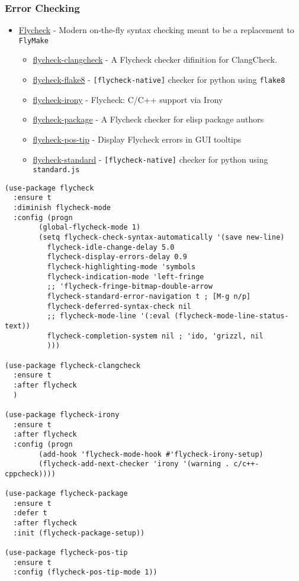 \documentclass[11pt]{article}
\begin{document}
\subsubsection{Error Checking}
\label{sec-1-6-3}
\begin{itemize}
\item \href{https://github.com/flycheck/flycheck}{Flycheck} - Modern on-the-fly syntax checking meant to be a replacement to \texttt{FlyMake}
\begin{itemize}
\item \href{https://github.com/kumar8600/flycheck-clangcheck}{flycheck-clangcheck} - A Flycheck checker difinition for ClangCheck.
\item \href{https://github.com/flycheck/flycheck}{flycheck-flake8} - \texttt{[flycheck-native]} checker for python using \texttt{flake8}
\item \href{https://github.com/Sarcasm/flycheck-irony}{flycheck-irony} - Flycheck: C/C++ support via Irony
\item \href{https://github.com/purcell/flycheck-package}{flycheck-package} - A Flycheck checker for elisp package authors
\item \href{https://github.com/flycheck/flycheck-pos-tip}{flycheck-pos-tip} - Display Flycheck errors in GUI tooltips
\item \href{https://github.com/flycheck/flycheck}{flycheck-standard} - \texttt{[flycheck-native]} checker for python using \texttt{standard.js}
\end{itemize}
\end{itemize}

\begin{verbatim}
(use-package flycheck
  :ensure t
  :diminish flycheck-mode
  :config (progn
	    (global-flycheck-mode 1)
	    (setq flycheck-check-syntax-automatically '(save new-line)
		  flycheck-idle-change-delay 5.0
		  flycheck-display-errors-delay 0.9
		  flycheck-highlighting-mode 'symbols
		  flycheck-indication-mode 'left-fringe
		  ;; 'flycheck-fringe-bitmap-double-arrow
		  flycheck-standard-error-navigation t ; [M-g n/p]
		  flycheck-deferred-syntax-check nil
		  ;; flycheck-mode-line '(:eval (flycheck-mode-line-status-text))
		  flycheck-completion-system nil ; 'ido, 'grizzl, nil
		  )))

(use-package flycheck-clangcheck
  :ensure t
  :after flycheck
  )

(use-package flycheck-irony
  :ensure t
  :after flycheck
  :config (progn
	    (add-hook 'flycheck-mode-hook #'flycheck-irony-setup)
	    (flycheck-add-next-checker 'irony '(warning . c/c++-cppcheck))))

(use-package flycheck-package
  :ensure t
  :defer t
  :after flycheck
  :init (flycheck-package-setup))

(use-package flycheck-pos-tip
  :ensure t
  :config (flycheck-pos-tip-mode 1))
\end{verbatim}
\end{document}
